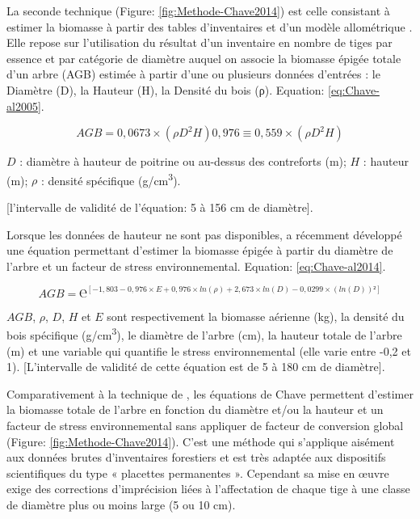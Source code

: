 \documentclass[
  12pt,
  a4paper,
  extrafontsizes,
  onecolumn,
  openright]{book}
\theoremstyle{definition}
\theoremstyle{definition}
\theoremstyle{definition}
\theoremstyle{definition}
\theoremstyle{remark}
\begin{document}
La seconde technique (Figure: \ref{fig:Methode-Chave2014}) est celle consistant à estimer la biomasse à partir des tables d'inventaires et d'un modèle allométrique \citep{Chave2005}. Elle repose sur l'utilisation du résultat d'un inventaire en nombre de tiges par essence et par catégorie de diamètre auquel on associe la biomasse épigée totale d'un arbre (AGB) estimée à partir d'une ou plusieurs données d'entrées : le Diamètre (D), la Hauteur (H), la Densité du bois (ρ). Equation: \eqref{eq:Chave-al2005}.

\begin{equation}
AGB=0,0673×(ρD^2 H)0,976≡0,559×(ρD^2 H)
\label{eq:Chave-al2005}
\end{equation}

\(D\) : diamètre à hauteur de poitrine ou au-dessus des contreforts (m); \(H\) : hauteur (m); \(ρ\) : densité spécifique (g/cm\textsuperscript{3}).

{[}l'intervalle de validité de l'équation: 5 à 156 cm de diamètre{]}.

Lorsque les données de hauteur ne sont pas disponibles, \citet{Chave2014} a récemment développé une équation permettant d'estimer la biomasse épigée à partir du diamètre de l'arbre et un facteur de stress environnemental. Equation: \eqref{eq:Chave-al2014}.

\begin{equation}
AGB=℮^[-1,803-0,976×E+0,976×ln⁡(ρ)+2,673×ln⁡(D)-0,0299×(ln(D))²]
\label{eq:Chave-al2014}
\end{equation}

\(AGB\), \(ρ\), \(D\), \(H\) et \(E\) sont respectivement la biomasse aérienne (kg), la densité du bois spécifique (g/cm\textsuperscript{3}), le diamètre de l'arbre (cm), la hauteur totale de l'arbre (m) et une variable qui quantifie le stress environnemental (elle varie entre -0,2 et 1). {[}L'intervalle de validité de cette équation est de 5 à 180 cm de diamètre{]}.

Comparativement à la technique de \citet{Brown_Lugo1992}, les équations de Chave permettent d'estimer la biomasse totale de l'arbre en fonction du diamètre et/ou la hauteur et un facteur de stress environnemental sans appliquer de facteur de conversion global (Figure: \ref{fig:Methode-Chave2014}). C'est une méthode qui s'applique aisément aux données brutes d'inventaires forestiers et est très adaptée aux dispositifs scientifiques du type « placettes permanentes ». Cependant sa mise en œuvre exige des corrections d'imprécision liées à l'affectation de chaque tige à une classe de diamètre plus ou moins large (5 ou 10 cm).
\end{document}
